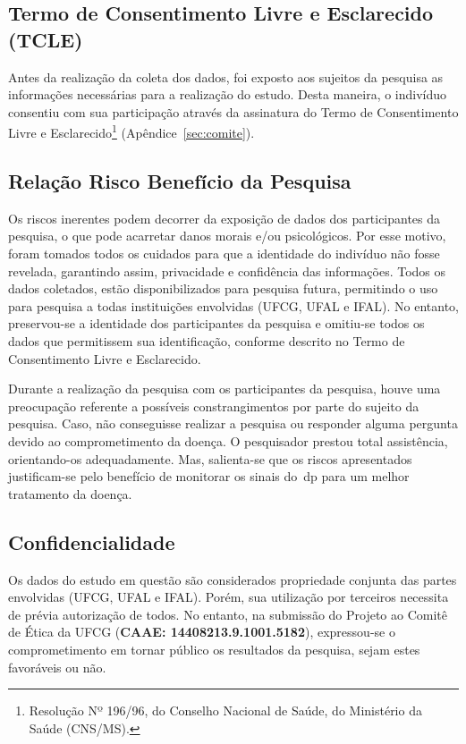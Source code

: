 \subsection{Termo de Consentimento Livre e Esclarecido (TCLE)}
Antes da realização da coleta dos dados, foi exposto aos sujeitos da pesquisa as informações necessárias para a realização do estudo. Desta maneira, o indivíduo consentiu com sua participação através da assinatura do Termo de Consentimento Livre e Esclarecido\footnote{Resolução Nº 196/96, do Conselho Nacional de Saúde, do Ministério da Saúde (CNS/MS).} (Apêndice~\ref{sec:comite}). 

\subsection{Relação Risco Benefício da Pesquisa}
Os riscos inerentes podem decorrer da exposição de dados dos participantes da pesquisa, o que pode acarretar danos morais e/ou psicológicos. Por esse motivo, foram tomados todos os cuidados para que a identidade do indivíduo não fosse revelada, garantindo assim, privacidade e confidência das informações. Todos os dados coletados, estão disponibilizados para pesquisa futura, permitindo o uso para pesquisa a todas instituições envolvidas (UFCG, UFAL e IFAL). No entanto, preservou-se a identidade dos participantes da pesquisa e omitiu-se todos os dados que permitissem sua identificação, conforme descrito no Termo de Consentimento Livre e Esclarecido.

Durante a realização da pesquisa com os participantes da pesquisa, houve uma preocupação referente a possíveis constrangimentos por parte do sujeito da pesquisa. Caso, não conseguisse realizar a pesquisa ou responder alguma pergunta devido ao comprometimento da doença. O pesquisador prestou total assistência, orientando-os adequadamente. Mas, salienta-se que os riscos apresentados justificam-se pelo benefício de monitorar os sinais do~\ac{dp} para um melhor tratamento da doença.


\subsection{Confidencialidade}
Os dados do estudo em questão são considerados propriedade conjunta das partes envolvidas (UFCG, UFAL e IFAL). Porém, sua utilização por terceiros necessita de prévia autorização de todos. No entanto, na submissão do Projeto ao Comitê de Ética da UFCG (\textbf{CAAE: 14408213.9.1001.5182}), expressou-se o comprometimento em tornar público os resultados da pesquisa, sejam estes favoráveis ou não.





